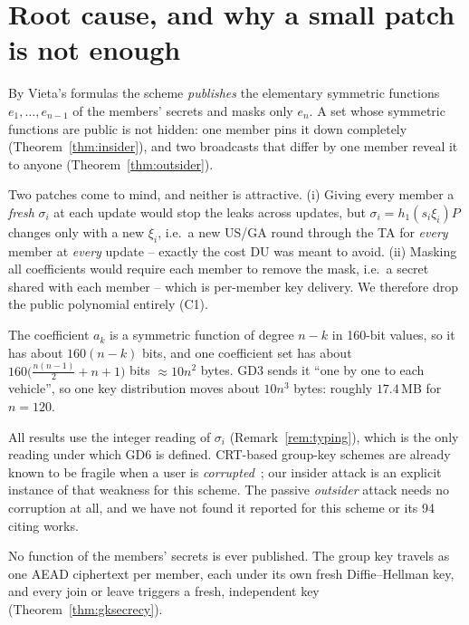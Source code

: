 \section{Root cause, and why a small patch is not enough}
By Vieta's formulas the scheme \emph{publishes} the elementary symmetric functions $e_1,\dots,e_{n-1}$ of the members' secrets and masks only
$e_n$. A set whose symmetric functions are public is not hidden: one member pins it down completely (Theorem~\ref{thm:insider}), and two broadcasts that
differ by one member reveal it to anyone (Theorem~\ref{thm:outsider}).

Two patches come to mind, and neither is attractive. (i) Giving every member a \emph{fresh} $\sigma_i$ at each update would stop the leaks across updates,
but $\sigma_i=h_1(s_i\xi_i)P$ changes only with a new $\xi_i$, i.e.\ a new US/GA round through the TA for \emph{every} member at \emph{every} update --
exactly the cost DU was meant to avoid. (ii) Masking all coefficients would require each member to remove the mask, i.e.\ a secret shared with each
member -- which is per-member key delivery. We therefore drop the public polynomial entirely (C1).

\begin{remark}\label{rem:size}
The coefficient $a_k$ is a symmetric function of degree $n-k$ in 160-bit values, so it has about $160(n-k)$ bits, and one coefficient set has about
$160\big(\tfrac{n(n-1)}{2}+n+1\big)$ bits $\approx10n^2$ bytes. GD3 sends it ``one by one to each vehicle'', so one key distribution moves about
$10n^3$ bytes: roughly $17.4$\,MB for $n=120$.
\end{remark}


\begin{limitbox}
All results use the integer reading of $\sigma_i$ (Remark~\ref{rem:typing}), which is the only reading under which GD6 is defined. CRT-based group-key
schemes are already known to be fragile when a user is \emph{corrupted}~\cite{sp24}; our insider attack is an explicit instance of that weakness for this
scheme. The passive \emph{outsider} attack needs no corruption at all, and we have not found it reported for this scheme or its 94 citing works.
\end{limitbox}

\begin{fixbox}[title={How C1 removes F2 (Chapter~\ref*{ch:c1})}]
No function of the members' secrets is ever published. The group key travels as one AEAD ciphertext per member, each under its own fresh
Diffie--Hellman key, and every join or leave triggers a fresh, independent key (Theorem~\ref{thm:gksecrecy}).
\end{fixbox}

